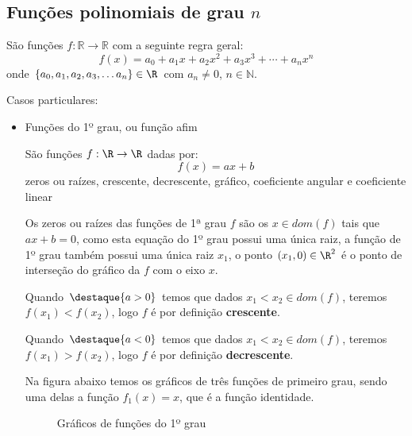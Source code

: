 \subsection{Funções polinomiais de grau \texorpdfstring{$n$}{n}}

 São funções $f: \mathbb{R} \rightarrow \mathbb{R}$ com a seguinte regra geral:
 \[f(x) = a_0 + a_1 x + a_2 x^2 + a_3 x^3 + \cdots + a_n x^n\]
 onde $\{a_0, a_1, a_2, a_3, \ldots a_n\} \in \R$ com $a_n \neq 0$, $n \in \mathbb{N}$.

 Casos particulares:
 \begin{itemize}
 \item Funções do 1º grau, ou função afim

 São funções $f: \R \rightarrow \R$ dadas por:
 \[f(x)= ax + b\]
 {\color{red} zeros ou raízes, crescente, decrescente, gráfico, coeficiente angular e coeficiente linear}

 Os zeros ou raízes das funções de 1ª grau $f$ são os $x \in dom(f)$ tais que $ax+b=0$, como esta equação do 1º grau possui uma única raiz, a função de 1º grau também possui uma única raiz $x_1$, o ponto $(x_1, 0) \in \R^2$ é o ponto de interseção do gráfico da $f$ com o eixo $x$.

 Quando $\destaque{a > 0}$ temos que dados $x_1 < x_2 \in dom(f)$, teremos $f(x_1) < f(x_2)$, logo $f$ é por definição \textbf{crescente}.

 Quando $\destaque{a < 0}$ temos que dados $x_1 < x_2 \in dom(f)$, teremos $f(x_1) > f(x_2)$, logo $f$ é por definição \textbf{decrescente}.

 Na figura abaixo temos os gráficos de três funções de primeiro grau, sendo uma delas a função $f_1(x)= x$, que é a função identidade.
 \begin{figure}[H]
 \centering
    \caption{Gráficos de funções do 1º grau}
  \end{figure}




\end{itemize}
